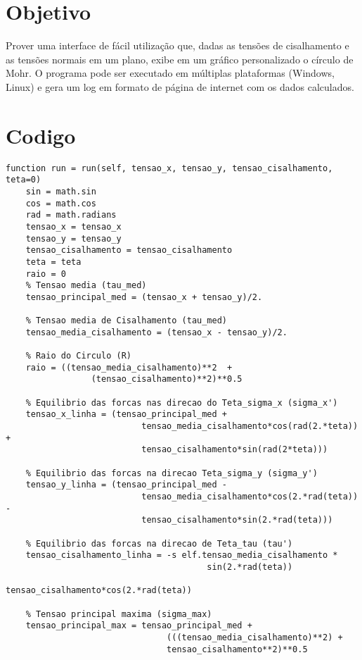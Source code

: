 \documentclass[a4paper]{article}
\begin{document}
\section{Objetivo}
Prover uma interface de fácil utilização que, dadas as tensões de cisalhamento e as tensões normais em um plano, exibe em um gráfico personalizado o círculo de Mohr. O programa pode ser executado em múltiplas plataformas (Windows, Linux) e gera um log em formato de página de internet com os dados calculados. 


\section{Codigo}

\begin{lstlisting}
function run = run(self, tensao_x, tensao_y, tensao_cisalhamento, teta=0)
    sin = math.sin
    cos = math.cos
    rad = math.radians
    tensao_x = tensao_x
    tensao_y = tensao_y
    tensao_cisalhamento = tensao_cisalhamento
    teta = teta
    raio = 0
    % Tensao media (tau_med)
    tensao_principal_med = (tensao_x + tensao_y)/2.

    % Tensao media de Cisalhamento (tau_med)
    tensao_media_cisalhamento = (tensao_x - tensao_y)/2.

    % Raio do Circulo (R)
    raio = ((tensao_media_cisalhamento)**2  + 
                 (tensao_cisalhamento)**2)**0.5

    % Equilibrio das forcas nas direcao do Teta_sigma_x (sigma_x')
    tensao_x_linha = (tensao_principal_med + 
                           tensao_media_cisalhamento*cos(rad(2.*teta)) +
                           tensao_cisalhamento*sin(rad(2*teta)))

    % Equilibrio das forcas na direcao Teta_sigma_y (sigma_y')
    tensao_y_linha = (tensao_principal_med - 
                           tensao_media_cisalhamento*cos(2.*rad(teta)) -
                           tensao_cisalhamento*sin(2.*rad(teta)))

    % Equilibrio das forcas na direcao de Teta_tau (tau')
    tensao_cisalhamento_linha = -s elf.tensao_media_cisalhamento * 
                                        sin(2.*rad(teta))                     
                                        tensao_cisalhamento*cos(2.*rad(teta))

    % Tensao principal maxima (sigma_max)
    tensao_principal_max = tensao_principal_med + 
                                (((tensao_media_cisalhamento)**2) + 
                                tensao_cisalhamento**2)**0.5


\end{lstlisting}
\end{document}
